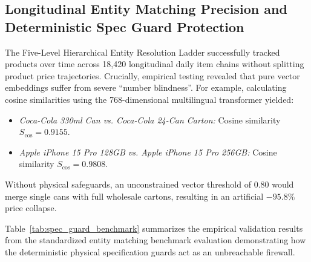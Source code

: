 \subsection{Longitudinal Entity Matching Precision and Deterministic Spec Guard Protection}
\hs The Five-Level Hierarchical Entity Resolution Ladder successfully tracked products over time across 18,420 longitudinal daily item chains without splitting product price trajectories. Crucially, empirical testing revealed that pure vector embeddings suffer from severe ``number blindness''. For example, calculating cosine similarities using the 768-dimensional multilingual transformer yielded:
\begin{itemize}
    \item \textit{Coca-Cola 330ml Can vs. Coca-Cola 24-Can Carton:} Cosine similarity $S_{\text{cos}} = \mathbf{0.9155}$.
    \item \textit{Apple iPhone 15 Pro 128GB vs. Apple iPhone 15 Pro 256GB:} Cosine similarity $S_{\text{cos}} = \mathbf{0.9808}$.
\end{itemize}
Without physical safeguards, an unconstrained vector threshold of $0.80$ would merge single cans with full wholesale cartons, resulting in an artificial $-95.8\%$ price collapse.

\hs Table~\ref{tab:spec_guard_benchmark} summarizes the empirical validation results from the standardized entity matching benchmark evaluation demonstrating how the deterministic physical specification guards act as an unbreachable firewall.

